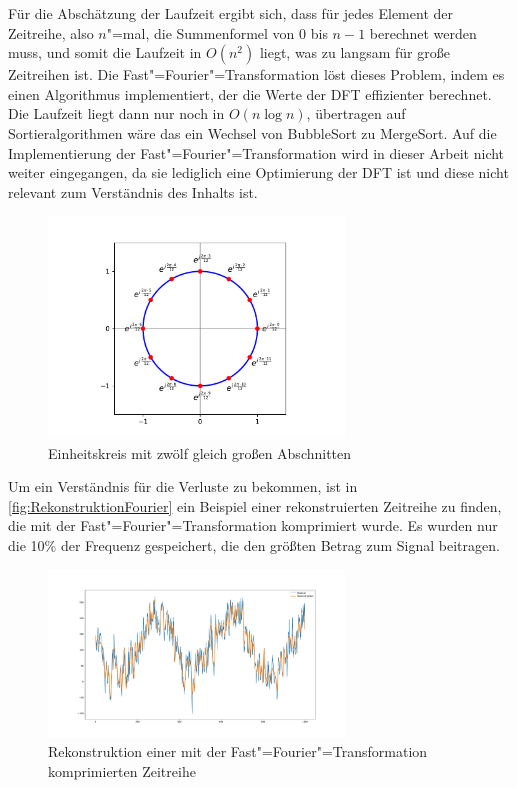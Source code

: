 Für die Abschätzung der Laufzeit ergibt sich, dass für jedes Element der Zeitreihe, also $n$"=mal, die Summenformel von 0 bis $n-1$ berechnet werden muss, und somit die Laufzeit in $O(n^2)$ liegt, was zu langsam für große Zeitreihen ist. Die Fast"=Fourier"=Transformation löst dieses Problem, indem es einen Algorithmus implementiert, der die Werte der \acs{DFT} effizienter berechnet. Die Laufzeit liegt dann nur noch in $O(n\log n)$, übertragen auf Sortieralgorithmen wäre das ein Wechsel von BubbleSort zu MergeSort. Auf die Implementierung der Fast"=Fourier"=Transformation wird in dieser Arbeit nicht weiter eingegangen, da sie lediglich eine Optimierung der \acs{DFT} ist und diese nicht relevant zum Verständnis des Inhalts ist.
\begin{figure}[bth] 
  \centering
  \includegraphics[width=0.7\textwidth]{Graphics/KomplexerEinheitskreis.pdf}
  \caption{Einheitskreis mit zwölf gleich großen Abschnitten}
  \label{fig:komplexerEinheitskreis}
\end{figure}

Um ein Verständnis für die Verluste zu bekommen, ist in \autoref{fig:RekonstruktionFourier} ein Beispiel einer rekonstruierten Zeitreihe zu finden, die mit der Fast"=Fourier"=Transformation komprimiert wurde. Es wurden nur die 10\% der Frequenz gespeichert, die den größten Betrag zum Signal beitragen.
\begin{figure}[bth] 
  \centering
  \includegraphics[width=0.7\textwidth]{Graphics/RekonstruktionFourier.pdf}
  \caption{Rekonstruktion einer mit der Fast"=Fourier"=Transformation komprimierten Zeit\-reihe}
  \label{fig:RekonstruktionFourier}
\end{figure}

